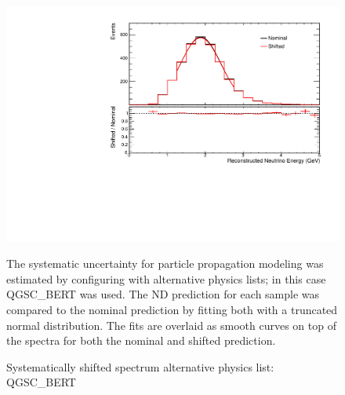 {\begin{figure}
\begin{center}
\includegraphics[width=\textwidth]{figures/systs/params/nd_QGSC_BERT.pdf}
\end{center}
\caption{Systematically shifted spectrum alternative \geant
physics list: QGSC\_BERT}{
The systematic uncertainty for particle propagation modeling was estimated
by configuring \geant with alternative physics lists; in this case QGSC\_BERT
was used.
The ND prediction for each sample was compared to the nominal prediction
by fitting both with a truncated normal distribution.
The fits are overlaid as smooth curves on top of the spectra for both
the nominal and shifted prediction.
}
\label{syst_param_nd_QGSC_BERT}

\end{figure}


}
